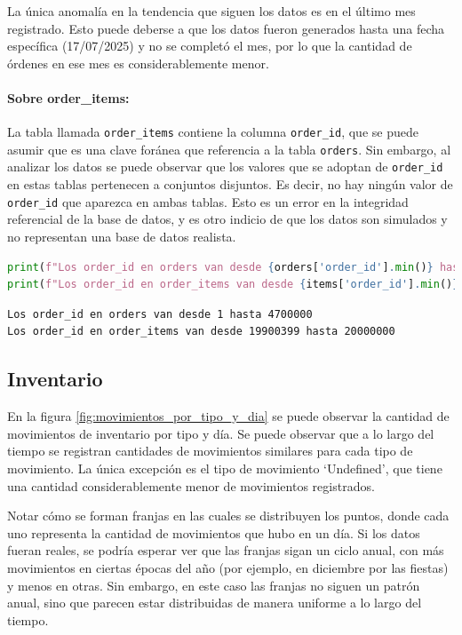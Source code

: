 La única anomalía en la tendencia que siguen los datos es en el último mes registrado. Esto puede deberse a que los datos fueron generados hasta una fecha específica (17/07/2025) y no se completó el mes, por lo que la cantidad de órdenes en ese mes es considerablemente menor.

\paragraph{Sobre order\_items:}
La tabla llamada \texttt{order\_items} contiene la columna \texttt{order\_id}, que se puede asumir que es una clave foránea que referencia a la tabla \texttt{orders}. Sin embargo, al analizar los datos se puede observar que los valores que se adoptan de \texttt{order\_id} en estas tablas pertenecen a conjuntos disjuntos. Es decir, no hay ningún valor de \texttt{order\_id} que aparezca en ambas tablas. Esto es un error en la integridad referencial de la base de datos, y es otro indicio de que los datos son simulados y no representan una base de datos realista.

\begin{lstlisting}[language=Python, xleftmargin=10pt, xrightmargin=10pt]
print(f"Los order_id en orders van desde {orders['order_id'].min()} hasta {orders['order_id'].max()}")
print(f"Los order_id en order_items van desde {items['order_id'].min()} hasta {items['order_id'].max()}")
\end{lstlisting}
\vspace{-10pt}
\begin{lstlisting}[style=console, xleftmargin=100pt, xrightmargin=100pt]
Los order_id en orders van desde 1 hasta 4700000
Los order_id en order_items van desde 19900399 hasta 20000000
\end{lstlisting}

\subsection{Inventario}

En la figura \ref{fig:movimientos_por_tipo_y_dia} se puede observar la cantidad de movimientos de inventario por tipo y día. Se puede observar que a lo largo del tiempo se registran cantidades de movimientos similares para cada tipo de movimiento. La única excepción es el tipo de movimiento `Undefined', que tiene una cantidad considerablemente menor de movimientos registrados.

Notar cómo se forman franjas en las cuales se distribuyen los puntos, donde cada uno representa la cantidad de movimientos que hubo en un día. Si los datos fueran reales, se podría esperar ver que las franjas sigan un ciclo anual, con más movimientos en ciertas épocas del año (por ejemplo, en diciembre por las fiestas) y menos en otras. Sin embargo, en este caso las franjas no siguen un patrón anual, sino que parecen estar distribuidas de manera uniforme a lo largo del tiempo.

